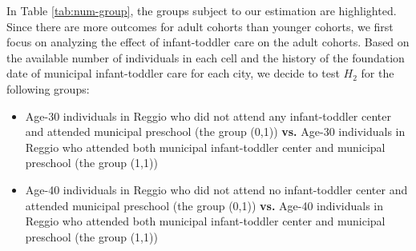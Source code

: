 \begin{table}[H] \caption{Number of Individuals in Each Group} \label{tab:num-group}
\end{table}

In Table \ref{tab:num-group}, the groups subject to our estimation are highlighted. Since there are more outcomes for adult cohorts than younger cohorts, we first focus on analyzing the effect of infant-toddler care on the adult cohorts. Based on the available number of individuals in each cell and the history of the foundation date of municipal infant-toddler care for each city, we decide to test $H_2$ for the following groups:
\begin{itemize}
\item Age-30 individuals in Reggio who did not attend any infant-toddler center and attended municipal preschool (the group (0,1)) \textbf{vs.} Age-30 individuals in Reggio who attended both municipal infant-toddler center and municipal preschool (the group (1,1))
\item Age-40 individuals in Reggio who did not attend no infant-toddler center and attended municipal preschool (the group (0,1)) \textbf{vs.} Age-40 individuals in Reggio who attended both municipal infant-toddler center and municipal preschool (the group (1,1))
\end{itemize}

